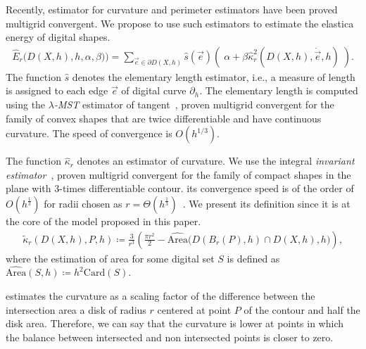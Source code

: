 \documentclass[review]{siamart220329}
\begin{document}
Recently, estimator for curvature and perimeter estimators have been proved multigrid convergent. We propose to use such estimators to estimate the elastica energy of digital shapes. 
%
%
\begin{align}
	\hat{E}_r\big( D(X,h),h,\alpha,\beta) \big) = \sum_{\vec{e} \in \partial D(X,h)}{ \hat{s}(\vec{e})\left(\; \alpha + \beta \hat{\kappa}_{r}^2(D(X,h),\dot{\vec{e}},h) \; \right)}.
	\label{eq:digital-energy}
\end{align}
%
%
The function $\hat{s}$ denotes the elementary length estimator, i.e., a measure of length is assigned to each edge $\vec{e}$ of digital curve $\partial_h$. The elementary length is computed using the \emph{$\lambda$-MST} estimator of tangent~\cite{lachaud07tangent,lachaud06hdr}, proven multigrid convergent for the family of convex shapes that are twice differentiable and have continuous curvature. The speed of convergence is $O(h^{1/3})$. 

The function $\hat{\kappa} _r$ denotes an estimator of curvature. We use the integral \emph{invariant estimator}~\cite{coeurjolly13integral}, proven multigrid convergent for the family of compact shapes in the plane with $3$-times differentiable contour.  its convergence speed is of the order of $O(h^{\frac{1}{3}})$ for radii chosen as $r=\Theta (h^{\frac{1}{3}})$~\cite{lachaud2017robust}. We present its definition since it is at the core of the model proposed in this paper.
%
%
\begin{align}
  \tilde{\kappa}_r(D(X,h),P,h) \coloneqq \frac{3}{r^3}\left( \frac{\pi r^2}{2} - \widehat{\text{Area}}\big( D(B_r(P),h) \cap D(X,h),h\big) \right),
  \label{eq:curvature_approximation}
\end{align}
%
%
where the estimation of area for some digital set $S$ is defined as $\widehat{\text{Area}}(S,h) \coloneqq h^2\text{Card}\left( S \right).$ 

 estimates the curvature as a scaling factor of the difference between the intersection area  a disk of radius $r$ centered at point $P$ of the contour and half the disk area. Therefore, we can say that the curvature is lower at points in which the balance between intersected and non intersected points is closer to zero.
\end{document}

